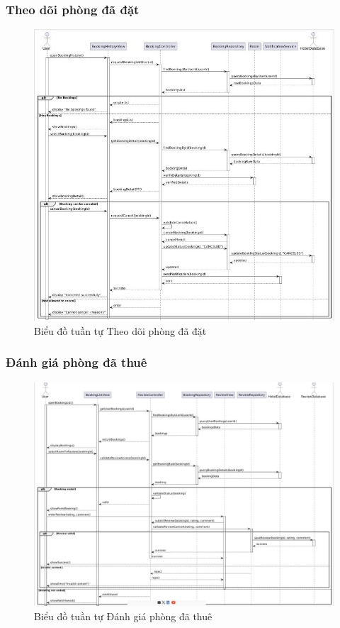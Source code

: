 \subsubsection{Theo dõi phòng đã đặt}
\begin{figure}[H]
    \centering
    \includegraphics[width=\textwidth]{img3.4/xemphongthue3.jpg} 
    \caption{Biểu đồ tuần tự Theo dõi phòng đã đặt}
\end{figure}

\subsubsection{Đánh giá phòng đã thuê}
\begin{figure}[H]
    \centering
    \includegraphics[width=\textwidth]{img3.4/dgia3.jpg} 
    \caption{Biểu đồ tuần tự Đánh giá phòng đã thuê}
\end{figure}

